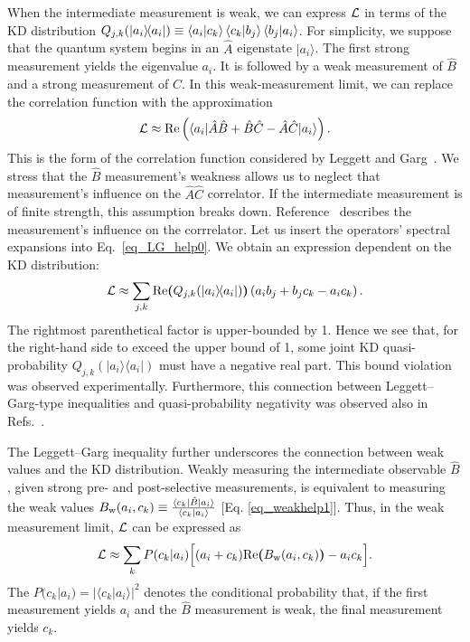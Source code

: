 \documentclass[%
 reprint,
superscriptaddress,
nofootinbib,
bibnotes,
 amsmath,amssymb,
 aps,
]{revtex4-1}
\theoremstyle{plain}
\newcommand*{\ketbra}[2]{\lvert #1 \rangle\!\langle #2 \rvert}
\def\la{\langle}
\def\ra{\rangle}
\def\be{\begin{equation}}
\def\ee{\end{equation}}
\newcommand{\LParen}{ \bm{(} }
\newcommand{\RParen}{ \bm{)} }
\begin{document}
When the intermediate measurement is weak, we can express ${\cal L}$ in terms of the  KD distribution $Q_{j,k}(\ketbra{a_i}{a_i}) \equiv \braket{a_i|c_k} \braket{c_k|b_j} \braket{b_j|a_i} $. 
For simplicity, we suppose that the quantum system begins in an $\hat A$ eigenstate $|a_i\ra$. The first strong measurement yields the eigenvalue $a_i$. It is followed by a weak measurement of ${\hat B}$ and a strong measurement of ${\hat C}$.  In this weak-measurement limit, we can replace the correlation function with the approximation
\be
\label{eq_LG_help0}
{\cal L} \approx {\rm Re} \left( \la a_i | {\hat A} {\hat B} + {\hat B} {\hat C} - {\hat A} {\hat C} | a_i \ra \right) .
\ee
This is the form of the correlation function considered by Leggett and Garg~\cite{Leggett85}.
We stress that the ${\hat B}$ measurement's weakness allows us to neglect that measurement's influence on the ${\hat A} {\hat C}$
correlator. If the intermediate measurement is of finite strength, this assumption breaks down. Reference~\cite{Williams08} describes the measurement's influence on the corrrelator.
Let us insert the operators' spectral expansions into Eq.~\eqref{eq_LG_help0}. We obtain an expression dependent on the KD distribution:
\be
{\cal L} \approx \sum_{j,k} 
{\rm Re} \LParen Q_{j,k}(\ketbra{a_i}{a_i}) \RParen
\left( a_i b_j + b_j c_k - a_i c_k\right).
\ee
The rightmost parenthetical factor is upper-bounded by 1. Hence we see that, for the right-hand side to exceed the upper bound of 1, 
some joint KD quasi-probability $Q_{j,k}(\ketbra{a_i}{a_i})$ must have a negative real part. 
This bound violation was observed experimentally.
Furthermore, this connection between Leggett--Garg-type inequalities and quasi-probability negativity was observed also in Refs.~\cite{Bednorz12,Dressel11}.

The Leggett--Garg inequality further underscores the connection between weak values and the KD distribution. Weakly measuring the intermediate observable $\hat{B} $, given strong pre- and post-selective measurements, is equivalent to measuring the weak values $B_{\mathrm{w}}(a_i,c_k) \equiv \frac{\braket{c_k | \hat{B} | a_i}}{\braket{c_k|a_i}}$ [Eq. \ref{eq_weakhelp1}]. Thus, in the weak measurement limit, ${\cal L}$ can be expressed as
\begin{align}
    \label{eq_LG_help1}
    {\cal L} \approx \sum_{k} P(c_k|a_i)
    \Big[ (a_i + c_k) {\rm Re} \LParen B_{\mathrm{w}}(a_i,c_k) \RParen - a_i c_k\Big].
\end{align}
The $P(c_k|a_i) = |\la c_k | a_i\ra|^2$ denotes the conditional probability that, if the first measurement yields $a_i$ and the $\hat{B}$ measurement is weak, the final measurement yields $c_k$.  
\end{document}
